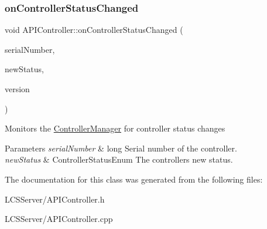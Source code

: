 \subsubsection{\texorpdfstring{on\+Controller\+Status\+Changed}{onControllerStatusChanged}}
{\footnotesize\ttfamily void A\+P\+I\+Controller\+::on\+Controller\+Status\+Changed (\begin{DoxyParamCaption}\item[{long}]{serial\+Number,  }\item[{\hyperlink{_global_defs_8h_a51207b6a49e0da6f9978a3019d93480a}{Controller\+Status\+Enum}}]{new\+Status,  }\item[{const Q\+String \&}]{version }\end{DoxyParamCaption})\hspace{0.3cm}{\ttfamily [slot]}}

Monitors the \hyperlink{class_controller_manager}{Controller\+Manager} for controller status changes 
\begin{DoxyParams}{Parameters}
{\em serial\+Number} & long Serial number of the controller. \\
\hline
{\em new\+Status} & Controller\+Status\+Enum The controller\textquotesingle{}s new status. \\
\hline
\end{DoxyParams}


The documentation for this class was generated from the following files\+:\begin{DoxyCompactItemize}
\item 
L\+C\+S\+Server/A\+P\+I\+Controller.\+h\item 
L\+C\+S\+Server/A\+P\+I\+Controller.\+cpp\end{DoxyCompactItemize}
